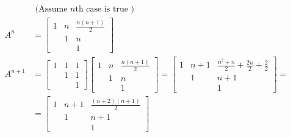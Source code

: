 \documentclass[twoside]{amsart}
\theoremstyle{plain}
\theoremstyle{definition}
\begin{document}
\[\begin{aligned}
\end{aligned}
 \quad \quad 
\begin{aligned}
  & \text{ (Assume $n$th case is true ) } \\
  A^n & = \left[ \begin{matrix} 1 & n & \frac{ n(n+1)}{2} \\ & 1 & n \\ & & 1 \end{matrix} \right] \\
  A^{n+1} & = \left[ \begin{matrix} 1 & 1 & 1 \\ & 1 & 1 \\ & & 1 \end{matrix} \right]\left[ \begin{matrix} 1 & n & \frac{n (n+1)}{2} \\ & 1 & n \\ & & 1 \end{matrix} \right] = \left[ \begin{matrix} 1 & n+1 & \frac{ n^2 + n}{2} + \frac{2n}{2} + \frac{2}{2} \\
      & 1 & n+1 \\
      & & 1 \end{matrix} \right] = \\
  & = \left[ \begin{matrix} 1 & n +1 & \frac{ (n+2)(n+1)}{2} \\ & 1 & n+1 \\ & & 1 \end{matrix} \right]
\end{aligned}
\]
\end{document}
